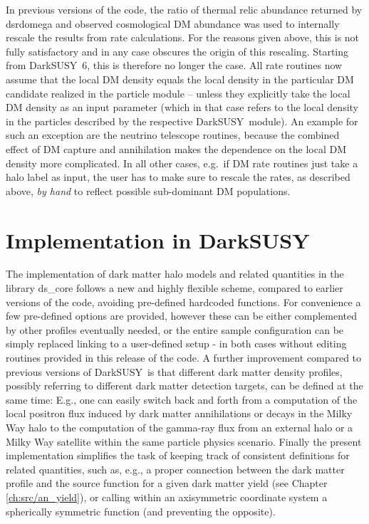 \documentclass[a4paper,10pt,oneside]{book}
\newcommand{\code}[1]{\ft{#1}}
\newcommand{\ds}{{\sffamily DarkSUSY}}
\newcommand{\ft}[1]{\textsf{#1}}
\begin{document}
In previous versions of the code, the ratio of thermal relic abundance returned
by \code{dsrdomega} and observed cosmological DM abundance
was used to internally rescale the results from rate calculations. For the reasons
given above, this is not fully satisfactory and in any case obscures the origin
of this rescaling. Starting from \ds\ 6, this is therefore no longer the case. 
All rate routines now assume that the local DM density equals the local density
in the particular DM candidate realized in the particle module -- 
unless they explicitly take the local DM density as an input parameter 
(which in that case refers to the local density in the particles described by the
respective \ds\ module). An example for such an exception are the 
neutrino telescope routines, because the combined effect of DM capture and
annihilation makes the dependence on the local DM density more complicated.
In all other cases, e.g.~if DM rate routines just take a halo label as input,
the user has to make sure to rescale the rates, as described above, {\it by hand}
to reflect possible sub-dominant DM populations.




\section{Implementation in \ds}

The implementation of dark matter halo models and related quantities in the library 
\code{ds\_core} follows a new and highly flexible scheme, compared to earlier versions of the code,
avoiding pre-defined hardcoded functions. 
For convenience a few pre-defined options are provided, however these can be either complemented by other profiles
eventually needed, or the entire sample configuration can be simply replaced linking to a user-defined setup 
- in both cases without editing routines provided in this release of the code. 
A further improvement compared to previous versions of \ds\ is that different dark matter density profiles, possibly referring to 
different dark matter detection targets, can be defined at the same time: E.g., one can easily
switch back and forth from a computation of the local positron flux induced by dark matter annihilations or decays in the
Milky Way halo to the computation of the gamma-ray flux from an external halo or a Milky Way satellite within the same   
particle physics scenario. Finally the present implementation simplifies the task of keeping track of consistent definitions 
for related quantities, such as, e.g., a proper connection between the dark matter profile and the source function 
for a given dark matter yield (see Chapter \ref{ch:src/an_yield}), or calling within an axisymmetric coordinate system a spherically symmetric function 
(and preventing the opposite). 
\end{document}
